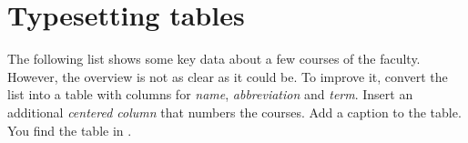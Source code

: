 \section{Typesetting tables}

The following list shows some key data about a few courses of the  faculty.
However, the overview is not as clear as it could be.
To improve it, convert the list into a table with columns for \emph{name}, \emph{abbreviation} and \emph{term}.
Insert an additional \emph{centered column} that numbers the courses. 
Add a caption to the table.
You find the table in .
